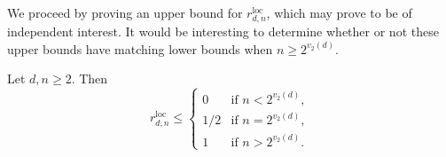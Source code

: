 \documentclass[11pt, reqno]{amsart}
\numberwithin{equation}{section}
\renewcommand{\leq}{\leqslant}
\renewcommand{\geq}{\geqslant}
\begin{document}
We proceed by 
proving an  upper bound for 
$r_{d,n}^{\mathrm{loc}}$, which may prove to be of independent interest. 
It would be interesting to determine whether or not these upper bounds have matching lower bounds 
when $n\geq 2^{v_2(d)}$.


\begin{lemma}
Let $d,n \geq 2$. Then
\begin{equation*}
r_{d,n}^{\mathrm{loc}} \leq 
\begin{cases}
0 & \textrm{if } n < 2^{v_2(d)}, \\
1/2 & \textrm{if } n = 2^{v_2(d)}, \\
1 & \textrm{if } n > 2^{v_2(d)}.
\end{cases}
\end{equation*}
\end{lemma}
\end{document}
